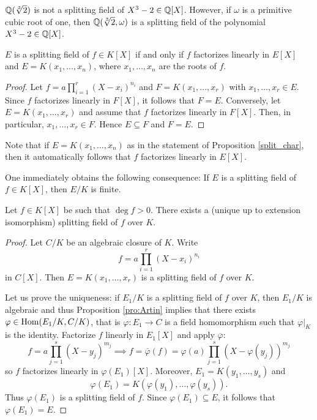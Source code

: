\begin{example}
	$\mathbb{Q}(\sqrt[3]{2})$ is not a splitting field of $X^3-2\in\mathbb{Q}[X]$. However, if
	$\omega$ is a primitive cubic root of one, then 
	$\mathbb{Q}(\sqrt[3]{2},\omega)$ is a splitting field of the polynomial $X^3-2\in\mathbb{Q}[X]$. 
\end{example}

\begin{proposition} \label{split_char}
	$E$ is a splitting field of $f\in K[X]$ if and only if
	$f$ factorizes linearly in $E[X]$ and $E=K(x_1,\dots,x_n)$, where 
	$x_1,\dots,x_n$ are the roots of $f$. 
\end{proposition}

\begin{proof}
    Let $f=a\prod_{i=1}^r(X-x_i)^{n_i}$ and $F=K(x_1,\dots,x_r)$ with $x_1,\dots,x_r\in E$. Since $f$
    factorizes linearly in $F[X]$, it follows that $F=E$. 
    Conversely, let $E=K(x_1,\dots,x_r)$ and assume that $f$ factorizes linearly
    in $F[X]$. Then, in particular, $x_1,\dots,x_r\in F$. Hence $E\subseteq F$ and
    $F=E$. 
\end{proof}

Note that if $E=K(x_1,\ldots,x_n)$ as in the statement of Proposition \ref{split_char}, then it automatically follows that $f$ factorizes linearly in $E[X]$.

One immediately obtains the following consequence:
If $E$ is a splitting field of $f\in K[X]$, then $E/K$ is finite. 

\begin{theorem}
    Let $f\in K[X]$ be such that $\deg f>0$. There exists a (unique up to extension isomorphism) 
    splitting field of $f$ over $K$. 
\end{theorem}

\begin{proof}
    Let $C/K$ be an algebraic closure of $K$. Write 
    \[
    f=a\prod_{i=1}^r(X-x_i)^{n_i}
    \]
    in $C[X]$. 
    Then $E=K(x_1,\dots,x_r)$ is a splitting field of $f$ over $K$. 
    
    Let us prove the 
    uniqueness: if $E_1/K$ is a splitting field of $f$ over $K$, 
    then $E_1/K$ is algebraic and thus Proposition
    \ref{pro:Artin} implies that 
    there exists $\varphi\in\operatorname{Hom}(E_1/K,C/K)$, that is $\varphi\colon E_1\to C$ is a field
    homomorphism such that $\varphi|_K$ is the identity.
    Factorize $f$ linearly in $E_1[X]$ and apply $\overline{\varphi}$:
    \[
    f=a\prod_{j=1}^s(X-y_j)^{m_j}
    \implies
    f=\overline{\varphi}(f)=\varphi(a)\prod_{j=1}^s(X-\varphi(y_j))^{m_j}
    \]
    so $f$ factorizes linearly in $\varphi(E_1)[X]$. Moreover, 
    $E_1=K(y_1,\dots,y_s)$ and  
    \[
    \varphi(E_1)=K(\varphi(y_1),\dots,\varphi(y_s)).
    \]
    Thus
    $\varphi(E_1)$ is a splitting field of $f$. Since  
    $\varphi(E_1)\subseteq E$, it follows that $\varphi(E_1)=E$. 
\end{proof}

